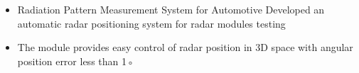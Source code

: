 


    \begin{itemize}
        \item Radiation Pattern Measurement System for Automotive Developed an automatic radar positioning system for radar modules testing
        \item The module provides easy control of radar position in 3D space with angular position error less than 1◦
    \end{itemize}

